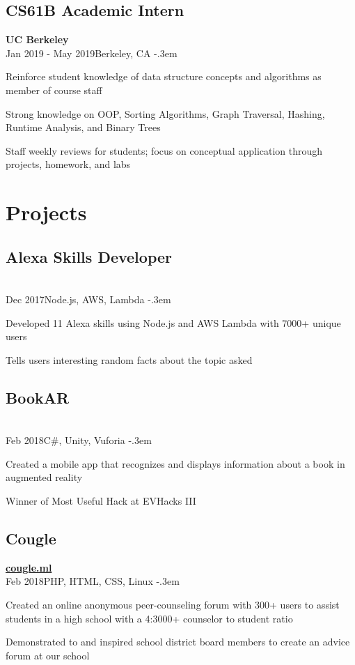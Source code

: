 \documentclass{article}
\let\olditemize=\itemize \let\endolditemize=\enditemize
\renewenvironment{itemize}{\olditemize[topsep=0em] \itemsep-.3em}{\endolditemize}
\newcommand{\myhref}[1]{\href{https://#1}{#1}}
\newcommand{\entry}[3]{\quad\textbf{#1}\\#2\qquad#3}
\begin{document}
\subsection{CS61B Academic Intern}
\entry{UC Berkeley}{Jan 2019 - May 2019}{Berkeley, CA}
\begin{itemize}
  \item Reinforce student knowledge of data structure concepts and
    algorithms as member of course staff
  \item Strong knowledge on OOP, Sorting Algorithms, Graph Traversal,
    Hashing, Runtime Analysis, and Binary Trees
  \item Staff weekly reviews for students; focus on conceptual
    application through projects, homework, and labs
\end{itemize}


\section{Projects}
\subsection{Alexa Skills Developer}
\entry{}{Dec 2017}{Node.js, AWS, Lambda}
\begin{itemize}
  \item Developed 11 Alexa skills using Node.js and AWS Lambda with 7000+ unique users
  \item Tells users interesting random facts about the topic asked
\end{itemize}

\subsection{BookAR}
\entry{}{Feb 2018}{C\#, Unity, Vuforia}
\begin{itemize}
  \item Created a mobile app that recognizes and displays information
    about a book in augmented reality
  \item Winner of Most Useful Hack at EVHacks III
\end{itemize}

\subsection{Cougle}
\entry{\myhref{cougle.ml}}{Feb 2018}{PHP, HTML, CSS, Linux}
\begin{itemize}
  \item Created an online anonymous peer-counseling forum with 300+ users to assist
    students in a high school with a 4:3000+ counselor to student ratio
  \item Demonstrated to and inspired school district board members to create an
    advice forum at our school
\end{itemize}
\end{document}
